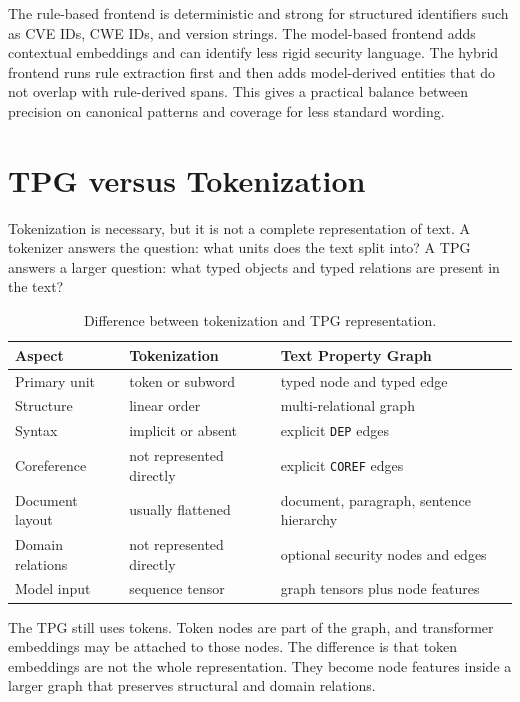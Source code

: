 \documentclass[11pt]{article}
\begin{document}
The rule-based frontend is deterministic and strong for structured identifiers
such as CVE IDs, CWE IDs, and version strings. The model-based frontend adds
contextual embeddings and can identify less rigid security language. The hybrid
frontend runs rule extraction first and then adds model-derived entities that
do not overlap with rule-derived spans. This gives a practical balance between
precision on canonical patterns and coverage for less standard wording.

\section{TPG versus Tokenization}

Tokenization is necessary, but it is not a complete representation of text. A
tokenizer answers the question: what units does the text split into? A TPG
answers a larger question: what typed objects and typed relations are present
in the text?

\begin{table}[h]
\centering
\small
\begin{tabular}{p{}p{}p{}}
\toprule
Aspect & Tokenization & Text Property Graph \\
\midrule
Primary unit & token or subword & typed node and typed edge \\
Structure & linear order & multi-relational graph \\
Syntax & implicit or absent & explicit \texttt{DEP} edges \\
Coreference & not represented directly & explicit \texttt{COREF} edges \\
Document layout & usually flattened & document, paragraph, sentence hierarchy \\
Domain relations & not represented directly & optional security nodes and edges \\
Model input & sequence tensor & graph tensors plus node features \\
\bottomrule
\end{tabular}
\caption{Difference between tokenization and TPG representation.}
\end{table}

The TPG still uses tokens. Token nodes are part of the graph, and transformer
embeddings may be attached to those nodes. The difference is that token
embeddings are not the whole representation. They become node features inside a
larger graph that preserves structural and domain relations.
\end{document}
